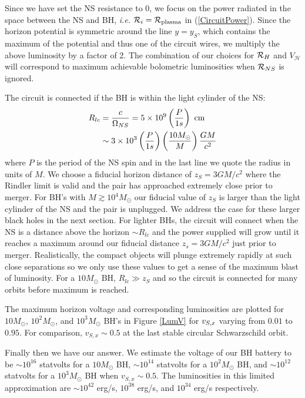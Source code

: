 Since we have set the NS resistance to 0, we focus on the power
radiated in the space between the NS and BH, \textit{i.e.} $\mathcal{R}_i =
\mathcal{R}_{\rm{plasma}}$ in (\ref{CircuitPower}).  Since the horizon
potential is symmetric around the line $y=y_S$, which contains the
maximum of the potential and thus one of the circuit wires, we
multiply the above luminosity by a factor of 2. The combination of our
choices for $\mathcal{R}_H$ and $V_{\mathcal{H}}$ will correspond to maximum
achievable bolometric luminosities when $\mathcal{R}_{NS}$ is ignored. 

The circuit is connected if the BH is within the light
cylinder of the NS:
 \begin{align}
R_{lc} & =\frac{c}{\Omega_{NS}} = 5 \times 10^9 \left(\frac{P}{ 1
  s}\right) \ \rm{cm} \nonumber \\
& \sim  3 \times 10^3 \left(\frac{P}{ 1 s}\right) \left (\frac{10
  M_\odot}{M}\right ) \frac{GM}{c^2}
 \label{RLC}
 \end{align}
where $P$ is the period of the NS spin and in the last line we quote
the radius in units of $M$. 
We choose a fiducial horizon distance of $z_S = 3GM/c^2$ where 
the Rindler limit is valid and the pair has approached extremely
close prior to merger. 
For BH's with $M\gtrsim 10^4 M_{\odot}$ 
our fiducial value of $z_S$ is larger than the light cylinder of the
NS and the pair is unplugged.
We address the case for these larger black holes in the next section.
For lighter BHs, the circuit will connect when the NS is a distance
above the horizon
$\sim R_{lc}$ and the power supplied will grow until it reaches a maximum around
our fiducial distance $z_s=3GM/c^2$ just prior to merger. Realistically, the compact objects will plunge
extremely rapidly at such close separations so we only use these values to get a sense of
the maximum blast of luminosity. For a
$10M_\odot$ BH, $R_{lc}\gg z_S$ and so the circuit is connected
for many orbits before maximum is reached.

The maximum horizon voltage and corresponding luminosities are plotted for 
$10  M_{\odot}$, $10^2  M_{\odot}$, and $10^3 M_{\odot}$ BH's in Figure \ref{LumV} 
for $v_{S, x}$ varying from $0.01$ to $0.95$.  For comparison, $v_{S,x}\sim 0.5$
at the last stable circular Schwarzschild orbit.

Finally then we have our answer. We estimate the voltage of our
BH battery to be $\sim 10^{16}$ statvolts for a $10M_\odot$
BH,  $\sim 10^{14}$ statvolts for a $10^2 M_\odot$ BH, and 
$\sim 10^{12}$ statvolts for a $10^3 M_\odot$ BH when $v_{S,x}\sim 0.5$.
The luminosities in this limited approximation are $\sim
10^{42}$ erg/s, $10^{38}$ erg/s, and $10^{34}$ erg/s respectively.

